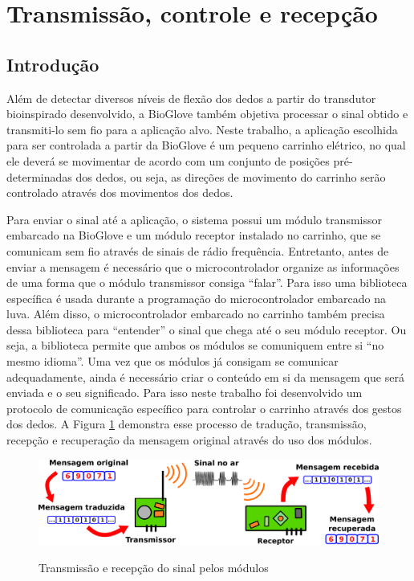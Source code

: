 \documentclass[
	12pt,				%
	openright,			%
	oneside,			%
	a4paper,			%
	english,			%
	brazil				%
	]{abntex2}
\begin{document}
	
		\section{Transmissão, controle e recepção}

		\subsection{Introdução}

		Além de detectar diversos níveis de flexão dos dedos a partir do transdutor bioinspirado desenvolvido, a BioGlove também objetiva processar o sinal obtido e transmiti-lo sem fio para a aplicação alvo. Neste trabalho, a aplicação escolhida para ser controlada a partir da BioGlove é um pequeno carrinho elétrico, no qual ele deverá se movimentar de acordo com um conjunto de posições pré-determinadas dos dedos, ou seja, as direções de movimento do carrinho serão controlado através dos movimentos dos dedos.

		Para enviar o sinal até a aplicação, o sistema possui um módulo transmissor embarcado na BioGlove e um módulo receptor instalado no carrinho, que se comunicam sem fio através de sinais de rádio frequência. Entretanto, antes de enviar a mensagem é necessário que o microcontrolador organize as informações de uma forma que o módulo transmissor consiga ``falar''. Para isso uma biblioteca específica é usada durante a programação do microcontrolador embarcado na luva. Além disso, o microcontrolador embarcado no carrinho também precisa dessa biblioteca para ``entender'' o sinal que chega até o seu módulo receptor. Ou seja, a biblioteca permite que ambos os módulos se comuniquem entre si ``no mesmo idioma''. Uma vez que os módulos já consigam se comunicar adequadamente, ainda é necessário criar o conteúdo em si da mensagem que será enviada e o seu significado. Para isso neste trabalho foi desenvolvido um protocolo de comunicação específico para controlar o carrinho através dos gestos dos dedos. A Figura \ref{Fig:tx-rx-scheme1} demonstra esse processo de tradução, transmissão, recepção e recuperação da mensagem original através do uso dos módulos.

		\begin{figure}[h!]
			\centering
			\caption{Transmissão e recepção do sinal pelos módulos}
  		\includegraphics[width=14cm]{./figures/tx-rx-scheme1.png}
  		\label{Fig:tx-rx-scheme1}
		\end{figure}
\end{document}
